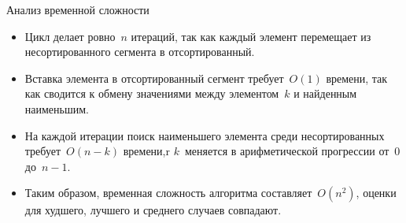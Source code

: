 \documentclass[landscape]{slides}
\begin{document}
\begin{slide}
  Анализ временной сложности
  \begin{itemize}
    \item Цикл делает ровно~$n$ итераций, так как каждый элемент перемещает из несортированного сегмента в отсортированный.
    \item Вставка элемента в отсортированный сегмент требует~$O(1)$ времени, так как сводится к обмену значениями между
      элементом~$k$ и найденным наименьшим.
    \item На каждой итерации поиск наименьшего элемента среди несортированных требует~$O(n-k)$ времени,r
      $k$~меняется в арифметической прогрессии от~0 до~$n-1$.
    \item Таким образом, временная сложность алгоритма составляет~$O(n^2)$, оценки для худшего, лучшего и среднего случаев
      совпадают.
  \end{itemize}
\end{slide}
\end{document}

